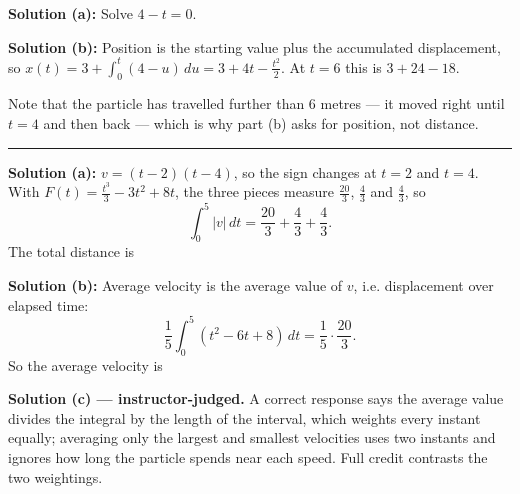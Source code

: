 \documentclass[12pt]{article}
\begin{document}
\textbf{Solution (a):} Solve $4 - t = 0$. 

\textbf{Solution (b):} Position is the starting value plus the accumulated displacement, so $x(t) = 3 + \displaystyle\int_0^t (4 - u)\,du = 3 + 4t - \tfrac{t^2}{2}$. At $t = 6$ this is $3 + 24 - 18$. 

Note that the particle has travelled further than $6$ metres --- it moved right until $t = 4$ and then back --- which is why part (b) asks for position, not distance.

\vspace{0.2cm}\noindent\rule{\linewidth}{0.2pt}\vspace{0.2cm}


\textbf{Solution (a):} $v = (t-2)(t-4)$, so the sign changes at $t = 2$ and $t = 4$. With $F(t) = \tfrac{t^3}{3} - 3t^2 + 8t$, the three pieces measure $\tfrac{20}{3}$, $\tfrac{4}{3}$ and $\tfrac{4}{3}$, so
\[ \int_0^5 |v|\,dt = \frac{20}{3} + \frac{4}{3} + \frac{4}{3}. \]
The total distance is 

\textbf{Solution (b):} Average velocity is the average value of $v$, i.e. displacement over elapsed time:
\[ \frac{1}{5}\int_0^5 (t^2 - 6t + 8)\,dt = \frac{1}{5}\cdot\frac{20}{3}. \]
So the average velocity is 

\textbf{Solution (c) --- instructor-judged.} A correct response says the average value divides the integral by the length of the interval, which weights every instant equally; averaging only the largest and smallest velocities uses two instants and ignores how long the particle spends near each speed. Full credit contrasts the two weightings.
\end{document}
